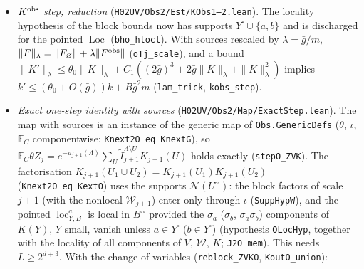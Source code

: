 \documentclass[11pt]{amsart}
\theoremstyle{definition}
\theoremstyle{remark}
\numberwithin{equation}{section}
\newcommand{\E}{\mathbb{E}}
\newcommand{\cS}{\mathcal{S}}
\newcommand{\Loc}{\operatorname{Loc}}
\begin{document}
\begin{itemize}
  and $\tau(C,\Gamma)=\Delta\Gamma(0)\sum_zC(p,z)$ for translation-invariant $\Gamma$
  (\texttt{mass1\_expLC\_FC\_psibar\_Vcoup}, \texttt{tauC\_TI}). Along a sequence of steps (hypothesis bundle
  \texttt{MuChain}), \texttt{mu\_flow\_exact} gives the exact identity
  $\beta_{j+1}=\beta_j(1-\mathfrak n_j)-\sum_{X\in\cS_j}m_1(K_j(X)_a)-R_j$, $\mathfrak n_j=\nu'_jC_j^{(1)}(a)+g'_j\tau(w_j,C_j)$,
  which equals $\nu'w_{j+1}^{(1)}-\nu^\flat w_j^{(1)}$ for translation-invariant $C_j$ (\texttt{frakN\_TI}). The remainder
  $R_j=\sum_{k<j}(\beta_kg'_k-\beta_jg'_j)\tau(C_k,C_j)+(\text{product parts})$ is explicit, and
  \texttt{mu\_flow\_bound} gives $|\beta_{j+1}-\beta_j(1-\mathfrak n_j)|\le E_K+ABq/(1-q)^2+E_P$ under the bounds
  $|\sum_Xm_1(K_j(X)_a)|\le E_K$, $|\beta_kg'_k-\beta_jg'_j|\le A(j-k)$, $|\tau(C_k,C_j)|\le Bq^{j-k}$ and product
  parts $\le E_P$ (hypothesis bundle \texttt{MuErr}). Case~(1) only.
\item \emph{$K^{\rm obs}$ step, reduction} (\texttt{H02UV/Obs2/Est/KObs1--2.lean}). The locality hypothesis of the block
  bounds now has supports $Y^\square\cup\{a,b\}$ and is discharged for the pointed $\Loc$ (\texttt{bho\_hlocl}).
  With sources rescaled by $\lambda=\bar g/m$, $\|F\|_\lambda=\|F_\varnothing\|+\lambda\|F^{\rm obs}\|$ (\texttt{oTj\_scale}), and a
  bound $\|K'\|_\lambda\le\theta_0\|K\|_\lambda+C_1((2\bar g)^3+2\bar g\|K\|_\lambda+\|K\|_\lambda^2)$ implies
  $k'\le(\theta_0+O(\bar g))k+B\bar g^2m$ (\texttt{lam\_trick}, \texttt{kobs\_step}).
\item \emph{Exact one-step identity with sources} (\texttt{H02UV/Obs2/Map/ExactStep.lean}). The map with sources is an instance of the
  generic map of \texttt{Obs.GenericDefs} ($\theta$, $\iota$, $\E_C$ componentwise; \texttt{Knext2O\_eq\_KnextG}), so
  $\E_C\theta Z_j=e^{-u_{j+1}(\Lambda)}\sum_U\tilde I_{j+1}^{\Lambda\setminus U}K_{j+1}(U)$ holds exactly (\texttt{stepO\_ZVK}).
  The factorisation $K_{j+1}(U_1\cup U_2)=K_{j+1}(U_1)K_{j+1}(U_2)$ (\texttt{Knext2O\_eq\_KextO}) uses the supports
  $\mathcal N(U^{\square\square})$: the block factors of scale $j+1$ (with the nonlocal $\mathcal W_{j+1}$) enter only through
  $\iota$ (\texttt{SuppHypW}), and the pointed $\operatorname{loc}^a_{Y,B}$ is local in $B^{\square\square}$ provided the
  $\sigma_a$ ($\sigma_b$, $\sigma_a\sigma_b$) components of $K(Y)$, $Y$ small, vanish unless $a\in Y^\square$ ($b\in Y^\square$)
  (hypothesis \texttt{OLocHyp}, together with the locality of all components of $V$, $\mathcal W$, $K$; \texttt{J2O\_mem}).
  This needs $L\ge2^{d+3}$. With the change of variables (\texttt{reblock\_ZVKO}, \texttt{KoutO\_union}):

\end{itemize}
\end{document}
